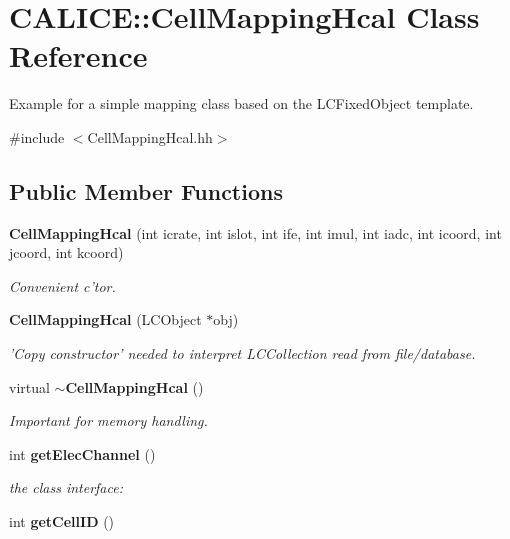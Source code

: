 \section{CALICE::CellMappingHcal Class Reference}
\label{classCALICE_1_1CellMappingHcal}


Example for a simple mapping class based on the LCFixedObject template.  


{\ttfamily \#include $<$CellMappingHcal.hh$>$}\subsection*{Public Member Functions}
\begin{DoxyCompactItemize}
\item 
{\bf CellMappingHcal} (int icrate, int islot, int ife, int imul, int iadc, int icoord, int jcoord, int kcoord)\label{classCALICE_1_1CellMappingHcal_a180c0b169a7f2c69770ae551aa4c776d}

\begin{DoxyCompactList}\small\item\em Convenient c'tor. \item\end{DoxyCompactList}\item 
{\bf CellMappingHcal} (LCObject $\ast$obj)\label{classCALICE_1_1CellMappingHcal_a0da96ba25246cd5cca90973d362e6c87}

\begin{DoxyCompactList}\small\item\em 'Copy constructor' needed to interpret LCCollection read from file/database. \item\end{DoxyCompactList}\item 
virtual {\bf $\sim$CellMappingHcal} ()\label{classCALICE_1_1CellMappingHcal_a83d82878315eb6feafff6da924cb0b3e}

\begin{DoxyCompactList}\small\item\em Important for memory handling. \item\end{DoxyCompactList}\item 
int {\bf getElecChannel} ()\label{classCALICE_1_1CellMappingHcal_ac7b97417224ddeba13c73d7659484ed0}

\begin{DoxyCompactList}\small\item\em the class interface: \item\end{DoxyCompactList}\item 
int {\bfseries getCellID} ()\label{classCALICE_1_1CellMappingHcal_a5e62c1a1fa22a5d93b59734f5c307fbf}


\end{DoxyCompactItemize}
